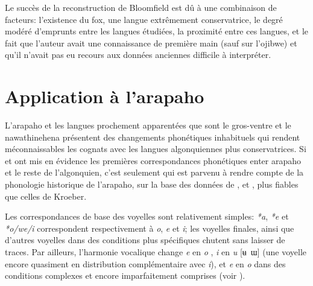 \documentclass[twoside,a4paper,11pt]{article}
\newcommand{\ipa}[1]{{\phon\textit{#1}}}
\newcommand{\Σ}{\greek{Σ}}
\begin{document}
Le succès de la reconstruction de Bloomfield  est dû à une combinaison de facteurs: l'existence du fox, une langue extrêmement conservatrice, le degré modéré d'emprunts entre les langues étudiées, la proximité entre ces langues,  et le fait que l'auteur avait une connaissance de première main (sauf sur l'ojibwe) et qu'il n'avait pas eu recours aux données anciennes difficile à interpréter.

\section{Application à l'arapaho}	
L'arapaho et les langues prochement apparentées que sont le gros-ventre et le nawathinehena présentent des changements phonétiques inhabituels qui rendent méconnaissables les cognats avec les langues algonquiennes plus conservatrices. Si \citet{kroeber16arapaho} et \citet{michelson35shifts} ont mis en évidence  les premières correspondances phonétiques enter arapaho et le reste de l'algonquien, c'est seulement  \citet{goddard74arapaho} qui est parvenu à rendre compte de la phonologie historique de l'arapaho, sur la base des données de \citet{salzmann56phono}, \citet{salzmann63arapaho} et \citet{taylor67atsina}, plus fiables que celles de Kroeber.
 
 Les correspondances de base des voyelles sont relativement simples: \ipa{*a}, \ipa{*e} et \ipa{*o/we/i} correspondent respectivement à \ipa{o}, \ipa{e} et \ipa{i}; les voyelles finales, ainsi que d'autres voyelles dans des conditions plus spécifiques  chutent sans laisser de traces. Par ailleurs, l'harmonie vocalique change  \ipa{e} en \ipa{o} , \ipa{i} en \ipa{u} [ʉ~ɯ] (une voyelle encore quasiment en distribution complémentaire avec \ipa{i}), et \ipa{e} en \ipa{o} dans des conditions complexes et encore imparfaitement comprises (voir \citealt[15-18, 20-22]{cowell06arapaho}).
 
\end{document}
